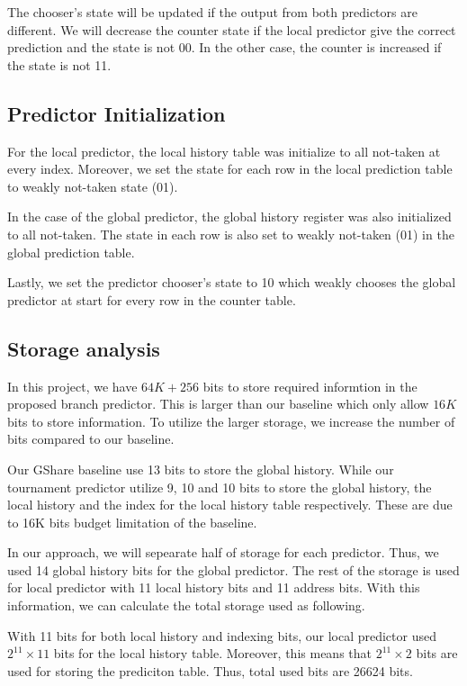 \documentclass[conference]{IEEEtran}
\begin{document}
The chooser's state will be updated if the output from both predictors are different. We will decrease the
counter state if the local predictor give the correct prediction and the state is not 00. In the other case,
the counter is increased if the state is not 11.

\subsection{Predictor Initialization}

For the local predictor, the local history table was initialize to all not-taken at every
index. Moreover, we set the state for each row in the local prediction table to weakly not-taken
state (01).

In the case of the global predictor, the global history register was also initialized to all not-taken.
The state in each row is also set to weakly not-taken (01) in the global prediction table.

Lastly, we set the predictor chooser's state to 10 which weakly chooses the global predictor
at start for every row in the counter table.

\subsection{Storage analysis}

In this project, we have $64K + 256$ bits to store required informtion in the proposed branch
predictor. This is larger than our baseline which only allow $16K$ bits to store information.
To utilize the larger storage, we increase the number of bits compared to our baseline.

Our GShare baseline use 13 bits to store the global history. While our tournament predictor
utilize 9, 10 and 10 bits to store the global history, the local history and the index for the
local history table respectively. These are due to 16K bits budget limitation of the baseline.

In our approach, we will sepearate half of storage for each predictor. Thus, we used 14 global
history bits for the global predictor. The rest of the storage is used for local predictor with
11 local history bits and 11 address bits. With this information, we can calculate the total
storage used as following.

With 11 bits for both local history and indexing bits, our local predictor used $2^{11} \times 11$
bits for the local history table. Moreover, this means that $2^{11} \times 2$ bits are used for
storing the prediciton table. Thus, total used bits are 26624 bits. 
\end{document}
